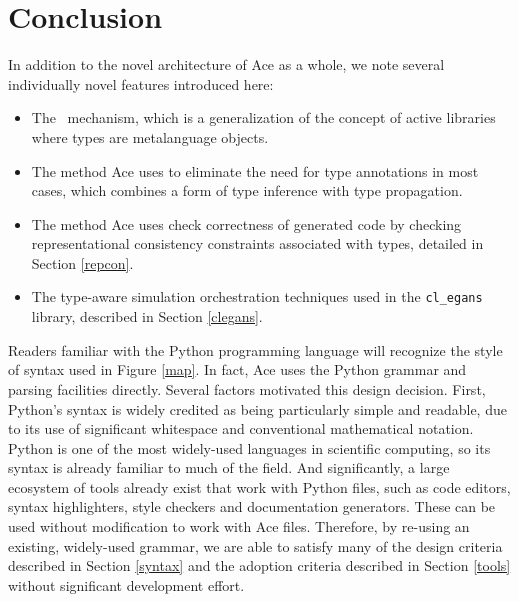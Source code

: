 \documentclass[10pt, conference, compsocconf]{IEEEtran}
\begin{document}
\section{Conclusion}
In addition to the novel architecture of Ace as a whole, we note several individually novel features introduced here: %

\begin{itemize}
\item The \ATT~mechanism, which is a generalization of the concept of active libraries \cite{activelibraries}  where types are metalanguage objects.
\item The method Ace uses to eliminate the need for type annotations in most cases, which combines a form of type inference with type propagation.
\item The method Ace uses check correctness of generated code by checking representational consistency constraints associated with types, detailed in Section \ref{repcon}. 
\item The type-aware simulation orchestration techniques used in the \texttt{cl\_egans} library, described in Section \ref{clegans}.
\end{itemize}

Readers familiar with the Python programming language will recognize the style of syntax used in Figure \ref{map}. In fact, Ace uses the Python grammar and parsing facilities directly. Several factors motivated this design decision. First, Python's syntax is widely credited as being particularly simple and readable, due to its use of significant whitespace and conventional mathematical notation. Python is one of the most widely-used languages in scientific computing, so its syntax is already familiar to much of the field. And significantly, a large ecosystem of tools already exist that work with Python files, such as code editors, syntax highlighters, style checkers and documentation generators. These can be used without modification to work with Ace files. Therefore, by re-using an existing, widely-used grammar, we are able to satisfy many of the design criteria described in Section \ref{syntax} and the adoption criteria described in Section \ref{tools} without significant development effort.
\end{document}
